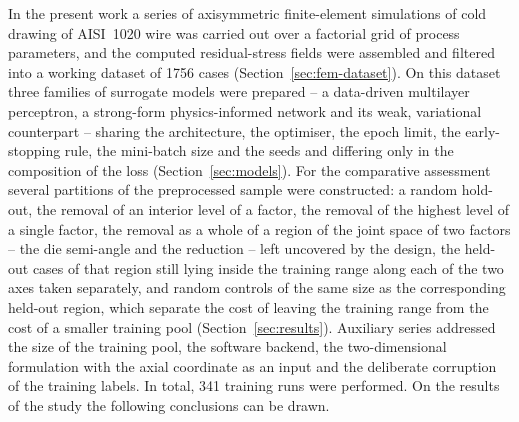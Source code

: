 In the present work a series of axisymmetric finite-element simulations of cold drawing of AISI~1020 wire was carried out over a factorial grid of process parameters, and the computed residual-stress fields were assembled and filtered into a working dataset of 1756 cases (Section~\ref{sec:fem-dataset}). On this dataset three families of surrogate models were prepared -- a data-driven multilayer perceptron, a strong-form physics-informed network and its weak, variational counterpart -- sharing the architecture, the optimiser, the epoch limit, the early-stopping rule, the mini-batch size and the seeds and differing only in the composition of the loss (Section~\ref{sec:models}). For the comparative assessment several partitions of the preprocessed sample were constructed: a random hold-out, the removal of an interior level of a factor, the removal of the highest level of a single factor, the removal as a whole of a region of the joint space of two factors -- the die semi-angle and the reduction -- left uncovered by the design, the held-out cases of that region still lying inside the training range along each of the two axes taken separately, and random controls of the same size as the corresponding held-out region, which separate the cost of leaving the training range from the cost of a smaller training pool (Section~\ref{sec:results}). Auxiliary series addressed the size of the training pool, the software backend, the two-dimensional formulation with the axial coordinate as an input and the deliberate corruption of the training labels. In total, 341 training runs were performed. On the results of the study the following conclusions can be drawn.


